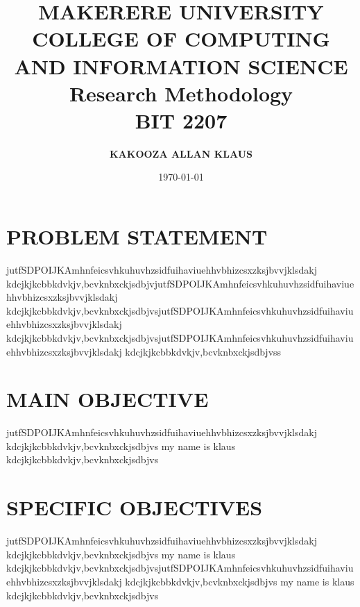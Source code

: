 \documentclass[a4paper,12pt]{article}
\begin{document}
\title{MAKERERE UNIVERSITY\\COLLEGE OF COMPUTING AND INFORMATION SCIENCE\\Research Methodology\\BIT 2207}
\author{\textbf{KAKOOZA ALLAN KLAUS}}
\date{\today}
\maketitle
\newpage






\section{PROBLEM STATEMENT}
\textsf{jutfSDPOIJKAmhnfeicsvhkuhuvhzsidfuihaviuehhvbhizcsxzksjbvvjklsdakj
kdcjkjkcbbkdvkjv,bcvknbxckjsdbjvjutfSDPOIJKAmhnfeicsvhkuhuvhzsidfuihaviuehhvbhizcsxzksjbvvjklsdakj
kdcjkjkcbbkdvkjv,bcvknbxckjsdbjvsjutfSDPOIJKAmhnfeicsvhkuhuvhzsidfuihaviuehhvbhizcsxzksjbvvjklsdakj
kdcjkjkcbbkdvkjv,bcvknbxckjsdbjvsjutfSDPOIJKAmhnfeicsvhkuhuvhzsidfuihaviuehhvbhizcsxzksjbvvjklsdakj
kdcjkjkcbbkdvkjv,bcvknbxckjsdbjvss}


\section{MAIN OBJECTIVE }
jutfSDPOIJKAmhnfeicsvhkuhuvhzsidfuihaviuehhvbhizcsxzksjbvvjklsdakj
kdcjkjkcbbkdvkjv,bcvknbxckjsdbjvs
my name is klaus
kdcjkjkcbbkdvkjv,bcvknbxckjsdbjvs

\section{SPECIFIC OBJECTIVES}
jutfSDPOIJKAmhnfeicsvhkuhuvhzsidfuihaviuehhvbhizcsxzksjbvvjklsdakj
kdcjkjkcbbkdvkjv,bcvknbxckjsdbjvs
my name is klaus
kdcjkjkcbbkdvkjv,bcvknbxckjsdbjvsjutfSDPOIJKAmhnfeicsvhkuhuvhzsidfuihaviuehhvbhizcsxzksjbvvjklsdakj
kdcjkjkcbbkdvkjv,bcvknbxckjsdbjvs
my name is klaus
kdcjkjkcbbkdvkjv,bcvknbxckjsdbjvs
\end{document}
